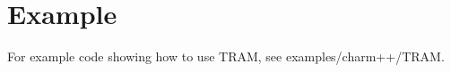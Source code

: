 
\section{Example}

For example code showing how to use TRAM, see examples/charm++/TRAM.

\thispagestyle{empty}
\pagestyle{empty}
